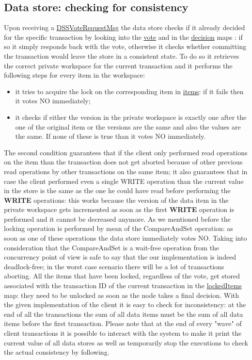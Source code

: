 \subsection{Data store: checking for consistency}
Upon receiving a \url{DSSVoteRequestMsg} the data store checks if it already decided for the specific transaction by looking into the \url{vote} and in the \url{decision} maps : if so it simply responds back with the vote, otherwise it checks whether committing the transaction would leave the store in a consistent state.
\newline
To do so it retrieves the correct private workspace for the current transaction and it performs the following steps for every item in the workspace:
\begin{itemize}
    \item it tries to acquire the lock on the corresponding item in \url{items}: if it fails then it votes NO immediately;
    \item it checks if either the version in the private workspace is exactly one after the one of the original item or the versions are the same and also the values are the same. If none of these is true than it votes NO immediately.
\end{itemize}
The second condition guarantees that if the client only performed read operations on the item than the transaction does not get aborted because of other previous read operations by other transactions on the same item; it also guarantees that in case the client performed even a single WRITE operation than the current value in the store is the same as the one he could have read before performing the \textbf{WRITE} operations: this works because the version of the data item in the private workspace gets incremented as soon as the first \textbf{WRITE} operation is performed and it cannot be decreased anymore.
\newline
As we mentioned before the locking operation is performed by mean of the CompareAndSet operation: as soon as one of these operations the data store immediately votes NO. Taking into consideration that the CompareAndSet is a wait-free operation from the concurrency point of view is safe to say that the our implementation is indeed deadlock-free; in the worst case scenario there will be a lot of transactions aborting.
\newline
All the items that have been locked, regardless of the vote, get stored associated with the transaction ID of the current transaction in the \url{lockedItems} map: they need to be unlocked as soon as the node takes a final decision.
\newline
With the given implementation of the client it is easy to check for inconsistency: at the end of all the transactions the sum of all data items must be the sum of all data items before the first transaction.
\newline
Please note that at the end of every "wave" of client transactions it is possible to interact with the system to make it print the current value of all data stores as well as temporarily stop the executions to check the actual consistency by following.

